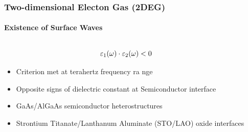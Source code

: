 \documentclass[mathserif,18pt,xcolor=table]{beamer}
\begin{document}
  \begin{frame}
    \frametitle{Two-dimensional Electon Gas (2DEG)}
    \framesubtitle{Existence of Surface Waves}
    \begin{columns} %
      \begin{column}[T]{.5\textwidth}
        \begin{equation} \nonumber
          \varepsilon_1(\omega) \cdot \varepsilon_2(\omega) < 0
          \label{eq:conditions}
        \end{equation}
        \begin{itemize}
          \item Criterion met at terahertz frequency ra nge
          \item Opposite signs of dielectric constant at Semiconductor interface
          \item GaAs/AlGaAs semiconductor heterostructures
          \item Strontium Titanate/Lanthanum Aluminate (STO/LAO) oxide interfaces
        \end{itemize}
      \end{column}
      \begin{column}[T]{.5\textwidth}
        \end{column}%
      \end{columns}
    \end{frame}

    
\end{document}
